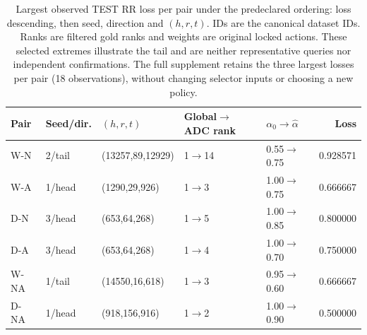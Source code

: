 \begin{table}[htbp]
\centering\footnotesize\setlength{\tabcolsep}{3pt}
\caption{Largest observed TEST RR loss per pair under the predeclared ordering: loss descending, then seed, direction and $(h,r,t)$. IDs are the canonical dataset IDs. Ranks are filtered gold ranks and weights are original locked actions. These selected extremes illustrate the tail and are neither representative queries nor independent confirmations. The full supplement retains the three largest losses per pair (18 observations), without changing selector inputs or choosing a new policy.}
\label{tab:outcome-examples}
\begin{tabular}{lllllr}
\toprule
Pair & Seed/dir. & $(h,r,t)$ & Global$\to$ADC rank & $\alpha_0\to\hat\alpha$ & Loss\\
\midrule
W-N & 2/tail & (13257,89,12929) & 1$\to$14 & 0.55$\to$0.75 & 0.928571\\
W-A & 1/head & (1290,29,926) & 1$\to$3 & 1.00$\to$0.75 & 0.666667\\
D-N & 3/head & (653,64,268) & 1$\to$5 & 1.00$\to$0.85 & 0.800000\\
D-A & 3/head & (653,64,268) & 1$\to$4 & 1.00$\to$0.70 & 0.750000\\
W-NA & 1/tail & (14550,16,618) & 1$\to$3 & 0.95$\to$0.60 & 0.666667\\
D-NA & 1/head & (918,156,916) & 1$\to$2 & 1.00$\to$0.90 & 0.500000\\
\bottomrule
\end{tabular}
\end{table}
